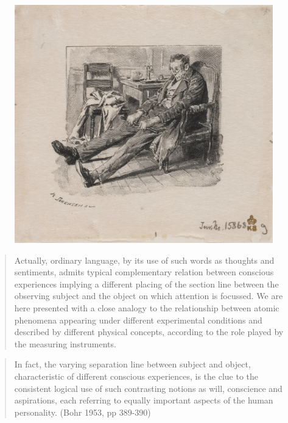 \documentclass[ignorenonframetext, ]{beamer}
\begin{document}
\begin{frame}

\begin{figure}
  \centering \includegraphics[scale=0.1]{licentiate.jpg}
\end{figure}
\end{frame}

\begin{frame}

  \begin{quote}
    Actually, ordinary language, by its use of such words as thoughts
    and sentiments, admits typical complementary relation between
    conscious experiences implying a different placing of the section
    line between the observing subject and the object on which
    attention is focussed. We are here presented with a close analogy
    to the relationship between atomic phenomena appearing under
    different experimental conditions and described by different
    physical concepts, according to the role played by the measuring
    instruments. \end{quote} \end{frame}

\begin{frame}

  \begin{quote} In fact, the varying separation line between subject
    and object, characteristic of different conscious experiences, is
    the clue to the consistent logical use of such contrasting notions
    as will, conscience and aspirations, each referring to equally
    important aspects of the human personality. (Bohr 1953, pp
    389-390)
\end{quote}
\end{frame}
\end{document}
